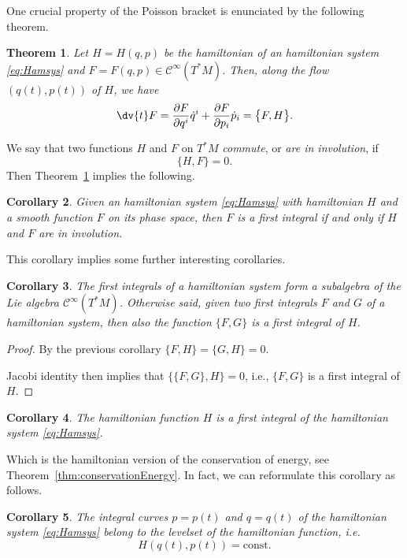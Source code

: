 \documentclass[english,fontsize=11pt,paper=b5]{scrbook}
\numberwithin{equation}{chapter}
\newtheorem{theorem}{Theorem}[chapter]
\newtheorem{corollary}[theorem]{Corollary}
\theoremstyle{definition}
\begin{document}
    One crucial property of the Poisson bracket is enunciated by the following theorem.

    \begin{theorem}\label{thm:poissondtdF}
      Let $H=H(q,p)$ be the hamiltonian of an hamiltonian system \eqref{eq:Hamsys} and $F=F(q,p)\in\mathcal{C}^\infty(T^*M)$.
      Then, along the flow $(q(t), p(t))$ of $H$, we have
      \begin{equation}
        \dv{t} F = \frac{\partial F}{\partial q^i} \dot q^i + \frac{\partial F}{\partial p_i} \dot p_i = \big\{F,H\big\}.
      \end{equation}
    \end{theorem}

    We say that two functions $H$ and $F$ on $T^* M$ \emph{commute}, or \emph{are in involution}, if
    \begin{equation}
      \big\{H,F\big\} = 0.
    \end{equation}
    Then Theorem~\ref{thm:poissondtdF} implies the following.
    \begin{corollary}
      Given an hamiltonian system \eqref{eq:Hamsys} with hamiltonian $H$ and a smooth function $F$ on its phase space, then $F$ is a first integral if and only if $H$ and $F$ are in involution.
    \end{corollary}

    This corollary implies some further interesting corollaries.
    \begin{corollary}
      The first integrals of a hamiltonian system form a subalgebra of the Lie algebra $\mathcal{C}^\infty(T^*M)$.
      Otherwise said, given two first integrals $F$ and $G$ of a hamiltonian system, then also the function $\big\{F,G\big\}$ is a first integral of $H$.
    \end{corollary}
    \begin{proof}
      By the previous corollary $\big\{F,H\big\} = \big\{G,H\big\} = 0$.

      Jacobi identity then implies that $\big\{\big\{F,G\big\},H\big\} = 0$, i.e., $\big\{F,G\big\}$ is a first integral of $H$.
    \end{proof}

    \begin{corollary}
      The hamiltonian function $H$ is a first integral of the hamiltonian system \eqref{eq:Hamsys}.
    \end{corollary}
    Which is the hamiltonian version of the conservation of energy, see Theorem~\ref{thm:conservationEnergy}.
    In fact, we can reformulate this corollary as follows.
    \begin{corollary}
      The integral curves $p = p(t)$ and $q=q(t)$ of the hamiltonian system \eqref{eq:Hamsys} belong to the levelset of the hamiltonian function, i.e.
      \begin{equation}
        H(q(t), p(t)) = \mathrm{const}.
      \end{equation}
    \end{corollary}
\end{document}
